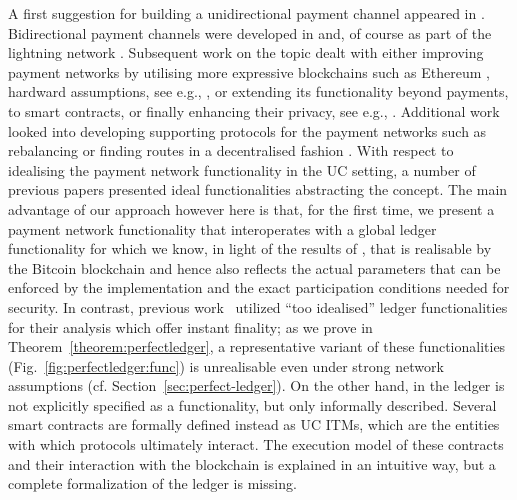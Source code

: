  A first suggestion for building a unidirectional
payment channel appeared in \cite{spilman}. Bidirectional payment channels were
developed in \cite{DBLP:conf/sss/DeckerW15} and, of course as part of the
lightning network \cite{lightning}. Subsequent work on the topic dealt with
either improving payment networks by utilising more expressive blockchains such
as Ethereum \cite{perun}, hardward assumptions, see e.g.,
\cite{DBLP:conf/systor/LindNEKPS18}, or extending its functionality beyond
payments, to smart contracts, \cite{sprites} or finally enhancing their privacy,
see e.g.,
\cite{Malavolta:2017:CPP:3133956.3134096,DBLP:conf/ccs/0001M17,DBLP:conf/ndss/HeilmanABSG17}.
Additional work looked into developing supporting protocols for the payment
networks such as rebalancing \cite{DBLP:conf/ccs/KhalilG17} or finding routes in
a decentralised fashion \cite{flare,spider}. With respect to idealising the
payment network functionality in the UC setting, a number of previous papers
\cite{DBLP:conf/ccs/DziembowskiFH18,Malavolta:2017:CPP:3133956.3134096,sprites,perun}
presented ideal functionalities abstracting the concept. The main advantage of
our approach however here is that, for the first time, we present a payment
network functionality that interoperates with a global ledger functionality for
which we know, in light of the results of \cite{BMTZ17}, that is realisable by
the Bitcoin blockchain and hence also reflects the actual parameters that can be
enforced by the implementation and the exact participation conditions needed for
security. In contrast, previous
work~\cite{DBLP:conf/ccs/DziembowskiFH18,Malavolta:2017:CPP:3133956.3134096,perun}
utilized ``too idealised'' ledger functionalities for their analysis which offer
instant finality; as we prove in Theorem~\ref{theorem:perfectledger}, a
representative variant of these functionalities
(Fig.~\ref{fig:perfectledger:func}) is unrealisable even under strong network
assumptions (cf. Section~\ref{sec:perfect-ledger}). On the other hand, in
\cite{sprites} the ledger is not explicitly specified as a functionality, but
only informally described. Several smart contracts are formally defined instead
as UC ITMs, which are the entities with which protocols ultimately interact. The
execution model of these contracts and their interaction with the blockchain is
explained in an intuitive way, but a complete formalization of the ledger is
missing.

